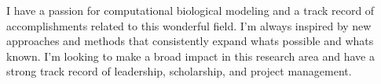 \break
\begin{cvparagraph}
\par
{I have a passion for computational biological modeling and a track record of accomplishments related to this wonderful field. I'm always inspired by new approaches and methods that consistently expand whats possible and whats known. I'm looking to make a broad impact in this research area and have a strong track record of leadership, scholarship, and project management. }
\end{cvparagraph}